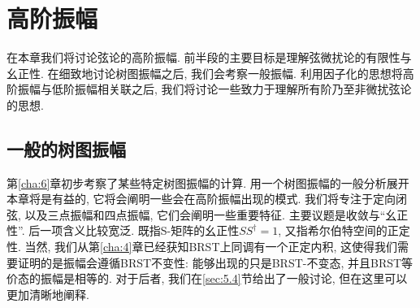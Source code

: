 
\chapter{高阶振幅} \label{cha:9}
在本章我们将讨论弦论的高阶振幅. 前半段的主要目标是理解弦微扰论的有限性与幺正性. 在细致地讨论树图振幅之后, 我们会考察一般振幅. 
利用因子化的思想将高阶振幅与低阶振幅相关联之后, 我们将讨论一些致力于理解所有阶乃至非微扰弦论的思想.

\section{一般的树图振幅} \label{sec:9.1}

第\ref{cha:6}章初步考察了某些特定树图振幅的计算. 用一个树图振幅的一般分析展开本章将是有益的, 它将会阐明一些会在高阶振幅出现的模式. 
我们将专注于定向闭弦, 以及三点振幅和四点振幅, 它们会阐明一些重要特征. 主要议题是收敛与``幺正性''. 后一项含义比较宽泛. 
既指S-矩阵的幺正性$S S^{\dagger}=1$, 又指希尔伯特空间的正定性. 当然, 我们从第\ref{cha:4}章已经获知BRST上同调有一个正定内积, 
这使得我们需要证明的是振幅会遵循BRST不变性: 能够出现的只是BRST-不变态, 并且BRST等价态的振幅是相等的. 
对于后者, 我们在\ref{sec:5.4}节给出了一般讨论, 但在这里可以更加清晰地阐释.

